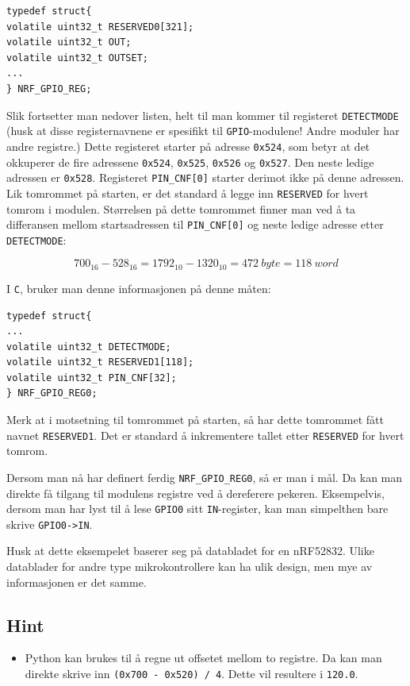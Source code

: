 \begin{lstlisting}
typedef struct{
volatile uint32_t RESERVED0[321];
volatile uint32_t OUT;
volatile uint32_t OUTSET;
...
} NRF_GPIO_REG;
\end{lstlisting}

Slik fortsetter man nedover listen, helt til man kommer til registeret \verb|DETECTMODE| (husk at disse registernavnene er spesifikt til \verb|GPIO|-modulene! Andre moduler har andre registre.) Dette registeret starter på adresse \verb|0x524|, som betyr at det okkuperer de fire adressene \verb|0x524|, \verb|0x525|, \verb|0x526| og \verb|0x527|. Den neste ledige adressen er \verb|0x528|. Registeret \verb|PIN_CNF[0]| starter derimot ikke på denne adressen. Lik tomrommet på starten, er det standard å legge inn \verb|RESERVED| for hvert tomrom i modulen. Størrelsen på dette tomrommet finner man ved å ta differansen mellom startsadressen til \verb|PIN_CNF[0]| og neste ledige adresse etter \verb|DETECTMODE|:

\begin{equation}
     700_{16} - 528_{16} = 1792_{10} - 1320_{10} = 472 \ byte = 118 \ word
\end{equation}

I \verb|C|, bruker man denne informasjonen på denne måten:

\begin{lstlisting}
typedef struct{
...
volatile uint32_t DETECTMODE;
volatile uint32_t RESERVED1[118];
volatile uint32_t PIN_CNF[32];
} NRF_GPIO_REG0;
\end{lstlisting}


Merk at i motsetning til tomrommet på starten, så har dette tomrommet fått navnet \verb|RESERVED1|. Det er standard å inkrementere tallet etter \verb|RESERVED| for hvert tomrom.


Dersom man nå har definert ferdig \verb|NRF_GPIO_REG0|, så er man i mål. Da kan man direkte få tilgang til modulens registre ved å dereferere pekeren. Eksempelvis, dersom man har lyst til å lese \verb|GPIO0| sitt \verb|IN|-register, kan man simpelthen bare skrive \verb|GPIO0->IN|.

\textcolor{RWTHrot100}{Husk at dette eksempelet baserer seg på databladet for en nRF52832. Ulike datablader for andre type mikrokontrollere kan ha ulik design, men mye av informasjonen er det samme.}

\subsection{Hint}
\begin{itemize}
    \item Python kan brukes til å regne ut offsetet mellom to registre. Da kan man direkte skrive inn \verb|(0x700 - 0x520) / 4|. Dette vil resultere i \verb|120.0|.

\end{itemize}



